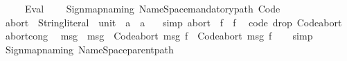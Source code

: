 \begin{isabellebody}
\ \ \ \ \ {\isacharparenleft}{\kern0pt}Eval{\isacharparenright}{\kern0pt}\ \ {}\ {\isachardoublequoteopen}{\isacharless}{\kern0pt}{\isachardoublequoteclose}%
\isadelimdocument
%
\endisadelimdocument
%
\isatagdocument
%
\isamarkuptrue%
%
\endisatagdocument
{\isafolddocument}%
%
\isadelimdocument
%
\endisadelimdocument
%
\isadelimML
%
\endisadelimML
%
\isatagML
{}\isamarkupfalse%
\ {\isacartoucheopen}Sign{\isachardot}{\kern0pt}map{\isacharunderscore}{\kern0pt}naming\ {\isacharparenleft}{\kern0pt}Name{\isacharunderscore}{\kern0pt}Space{\isachardot}{\kern0pt}mandatory{\isacharunderscore}{\kern0pt}path\ {\isachardoublequote}{\kern0pt}Code{\isachardoublequote}{\kern0pt}{\isacharparenright}{\kern0pt}{\isacartoucheclose}%
\endisatagML
{\isafoldML}%
%
\isadelimML
%
\endisadelimML
\isanewline
\isanewline
{}\isamarkupfalse%
\ abort\ {\isacharcolon}{\kern0pt}{\isacharcolon}{\kern0pt}\ {\isachardoublequoteopen}String{\isachardot}{\kern0pt}literal\ {\isasymRightarrow}\ {\isacharparenleft}{\kern0pt}unit\ {\isasymRightarrow}\ {\isacharprime}{\kern0pt}a{\isacharparenright}{\kern0pt}\ {\isasymRightarrow}\ {\isacharprime}{\kern0pt}a{\isachardoublequoteclose}\isanewline
\ \ \ {\isacharbrackleft}{\kern0pt}simp{\isacharbrackright}{\kern0pt}{\isacharcolon}{\kern0pt}\ {\isachardoublequoteopen}abort\ {\isacharunderscore}{\kern0pt}\ f\ {\isacharequal}{\kern0pt}\ f\ {\isacharparenleft}{\kern0pt}{\isacharparenright}{\kern0pt}{\isachardoublequoteclose}\isanewline
\isanewline
{}\isamarkupfalse%
\ {\isacharbrackleft}{\kern0pt}{\isacharbrackleft}{\kern0pt}code\ drop{\isacharcolon}{\kern0pt}\ Code{\isachardot}{\kern0pt}abort{\isacharbrackright}{\kern0pt}{\isacharbrackright}{\kern0pt}\isanewline
\isanewline
{}\isamarkupfalse%
\ abort{\isacharunderscore}{\kern0pt}cong{\isacharcolon}{\kern0pt}\isanewline
\ \ {\isachardoublequoteopen}msg\ {\isacharequal}{\kern0pt}\ msg{\isacharprime}{\kern0pt}\ {\isasymLongrightarrow}\ Code{\isachardot}{\kern0pt}abort\ msg\ f\ {\isacharequal}{\kern0pt}\ Code{\isachardot}{\kern0pt}abort\ msg{\isacharprime}{\kern0pt}\ f{\isachardoublequoteclose}\isanewline
%
\isadelimproof
\ \ %
\endisadelimproof
%
\isatagproof
{}\isamarkupfalse%
\ simp%
\endisatagproof
{\isafoldproof}%
%
\isadelimproof
\isanewline
%
\endisadelimproof
%
\isadelimML
\isanewline
%
\endisadelimML
%
\isatagML
{}\isamarkupfalse%
\ {\isacartoucheopen}Sign{\isachardot}{\kern0pt}map{\isacharunderscore}{\kern0pt}naming\ Name{\isacharunderscore}{\kern0pt}Space{\isachardot}{\kern0pt}parent{\isacharunderscore}{\kern0pt}path{\isacartoucheclose}\isanewline

\end{isabellebody}
